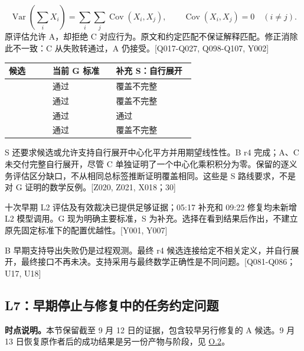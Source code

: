 \[
\operatorname{Var}\!\left(\sum_i X_i\right)
=\sum_i\sum_j\operatorname{Cov}(X_i,X_j),
\qquad \operatorname{Cov}(X_i,X_j)=0\quad(i\ne j).
\]
原评估允许 A，却拒绝 C 对应行为。原文和约定匹配不保证解释匹配。修正消除此不一致：C 从失败转通过，A 仍接受。[Q017-Q027, Q098-Q107, Y002]

\begingroup\small\setlength{\tabcolsep}{3pt}\renewcommand{\arraystretch}{1.14}
\par\nopagebreak\medskip\noindent\begin{minipage}[t]{\linewidth}
\begin{tabular}{>{\raggedright\arraybackslash}p{0.22\linewidth}>{\raggedright\arraybackslash}p{0.32\linewidth}>{\raggedright\arraybackslash}p{0.4\linewidth}}
\toprule
\textbf{候选} & \textbf{当前 G 标准} & \textbf{补充 S：自行展开}\\\midrule

{A} & {通过} & {覆盖不完整}\\
{早期 B} & {通过} & {覆盖不完整}\\
{B r4} & {通过} & {通过}\\
{C} & {通过} & {覆盖不完整}\\
\bottomrule\end{tabular}\end{minipage}\par\medskip\endgroup
S 还要求候选或允许支持自行展开中心化平方并用期望线性性。B r4 完成；A、C 未交付完整自行展开，尽管 C 单独证明了一个中心化乘积积分为零。保留的逐义务评估区分缺口，不从相同总标签推断证明覆盖相同。这些是 S 路线要求，不是对 G 证明的数学反例。[Z020, Z021, X018；30]

十次早期 L2 评估及有效裁决已提供足够证据；05:17 补充和 09:22 修复均未新增 L2 模型调用。G 现为明确主要标准，S 为补充。选择在看到结果后作出，不建立原先固定标准下的配置优越性。[Y001, Y007]

B 早期支持导出失败仍是过程观测。最终 r4 候选连接给定不相关定义，并自行展开，最终接口不再未决。支持采用与最终数学正确性是不同问题。[Q081-Q086；U17, U18]

\subsection[L7：早期停止与修复中的任务约定问题]{\texorpdfstring{\protect\hypertarget{g16}{}L7：早期停止与修复中的任务约定问题}{L7：早期停止与修复中的任务约定问题}}
\textbf{时点说明。}本节保留截至 9 月 12 日的证据，包含较早另行修复的 A 候选。9 月 13 日恢复原作者后的成功结果是另一份产物与阶段，见 \hyperlink{o2}{O.2}。

